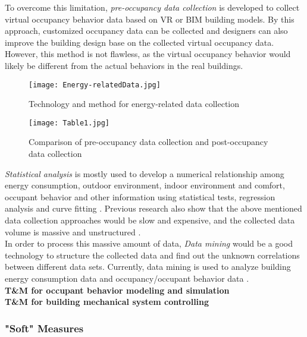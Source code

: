 \documentclass[11pt, a4paper]{article}
\theoremstyle{definition}
\begin{document}
			To overcome this limitation, \textit{pre-occupancy data collection} is developed to collect virtual occupancy behavior data based on VR or BIM building models. By this approach, customized occupancy data can be collected and designers can also improve the building design base on the collected virtual occupancy data. However, this method is not flawless, as the virtual occupancy behavior would likely be different from the actual behaviors in the real buildings.\\


			\begin{figure}[h!]
			\centering
			\texttt{[image: Energy-relatedData.jpg]}
			\caption{Technology and method for energy-related data collection \cite{jia2017occupancy}}
			\label{fig:Energy_DataCollection}
			\end{figure}

			\begin{figure}[h!]
			\centering
			\texttt{[image: Table1.jpg]}
			\caption{Comparison of pre-occupancy data collection and post-occupancy data collection \cite{ZOU2018165}}
			\label{fig:technology1}
			\end{figure}

			\textit{Statistical analysis} is mostly used to develop a numerical relationship among energy consumption, outdoor environment, indoor environment and comfort, occupant behavior and other information using statistical tests, regression analysis and curve fitting \cite{ZOU2018165}. Previous research also show that the above mentioned data collection approaches would be slow and expensive, and the collected data volume is massive and unstructured \cite{liang2016occupancy}.\\

			In order to process this massive amount of data, \textit{Data mining} would be a good technology to structure the collected data and find out the unknown correlations between different data sets. Currently, data mining is used to analyze building energy consumption data and occupancy/occupant behavior data \cite{xiao2014data}.\\

			\textbf{T\&M for occupant behavior modeling and simulation}\\


			\textbf{T\&M for building mechanical system controlling}\\

		\subsubsection{"Soft" Measures}
\end{document}
